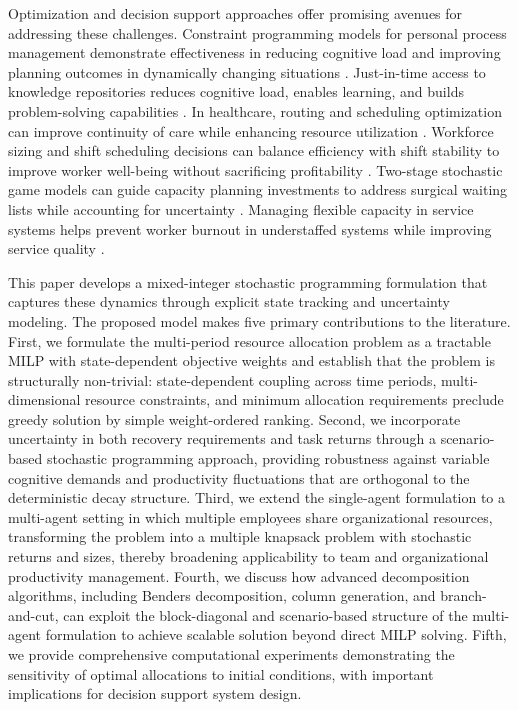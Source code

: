 \documentclass[preprint,review,11pt]{elsarticle}
\begin{document}
Optimization and decision support approaches offer promising avenues for addressing these challenges. Constraint programming models for personal process management demonstrate effectiveness in reducing cognitive load and improving planning outcomes in dynamically changing situations \citep{oruç_constraint_2022}. Just-in-time access to knowledge repositories reduces cognitive load, enables learning, and builds problem-solving capabilities \citep{subramani_capability_2021}. In healthcare, routing and scheduling optimization can improve continuity of care while enhancing resource utilization \citep{lahrichi_first_2022}. Workforce sizing and shift scheduling decisions can balance efficiency with shift stability to improve worker well-being without sacrificing profitability \citep{mandal_tactical_2025}. Two-stage stochastic game models can guide capacity planning investments to address surgical waiting lists while accounting for uncertainty \citep{acuna_two_2024}. Managing flexible capacity in service systems helps prevent worker burnout in understaffed systems while improving service quality \citep{yuan_managing_2025}.

This paper develops a mixed-integer stochastic programming formulation that captures these dynamics through explicit state tracking and uncertainty modeling. The proposed model makes five primary contributions to the literature. First, we formulate the multi-period resource allocation problem as a tractable MILP with state-dependent objective weights and establish that the problem is structurally non-trivial: state-dependent coupling across time periods, multi-dimensional resource constraints, and minimum allocation requirements preclude greedy solution by simple weight-ordered ranking. Second, we incorporate uncertainty in both recovery requirements and task returns through a scenario-based stochastic programming approach, providing robustness against variable cognitive demands and productivity fluctuations that are orthogonal to the deterministic decay structure. Third, we extend the single-agent formulation to a multi-agent setting in which multiple employees share organizational resources, transforming the problem into a multiple knapsack problem with stochastic returns and sizes, thereby broadening applicability to team and organizational productivity management. Fourth, we discuss how advanced decomposition algorithms, including Benders decomposition, column generation, and branch-and-cut, can exploit the block-diagonal and scenario-based structure of the multi-agent formulation to achieve scalable solution beyond direct MILP solving. Fifth, we provide comprehensive computational experiments demonstrating the sensitivity of optimal allocations to initial conditions, with important implications for decision support system design.
\end{document}
